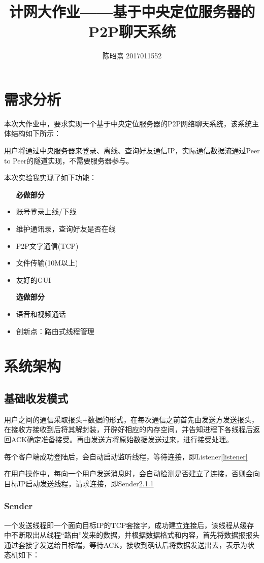 \documentclass[UTF8]{ctexart}
\begin{document}
\title{计网大作业——基于中央定位服务器的P2P聊天系统}
\author{陈昭熹 2017011552}
\maketitle
\tableofcontents
\newpage

\section{需求分析}
本次大作业中，要求实现一个基于中央定位服务器的P2P网络聊天系统，该系统主体结构如下所示：

用户将通过中央服务器来登录、离线、查询好友通信IP，实际通信数据流通过Peer to Peer的隧道实现，不需要服务器参与。

本次实验我实现了如下功能：
\begin{itemize}
    \item[\textbf{必做部分}] 
    \item 账号登录上线/下线
    \item 维护通讯录，查询好友是否在线
    \item P2P文字通信(TCP)
    \item 文件传输(10M以上)
    \item 友好的GUI
    \item[\textbf{选做部分}]
    \item 语音和视频通话
    \item 创新点：路由式线程管理 
\end{itemize}

\section{系统架构}

\subsection{基础收发模式}

用户之间的通信采取报头+数据的形式，在每次通信之前首先由发送方发送报头，在接收方接收到后将其解封装，开辟好相应的内存空间，并告知进程下各线程后返回ACK确定准备接受。再由发送方将原始数据发送过来，进行接受处理。

每个客户端成功登陆后，会自动启动监听线程，等待连接，即Listener\ref{listener}

在用户操作中，每向一个用户发送消息时，会自动检测是否建立了连接，否则会向目标IP启动发送线程，请求连接，即Sender\ref{sender}

\subsubsection{Sender}\label{sender}
一个发送线程即一个面向目标IP的TCP套接字，成功建立连接后，该线程从缓存中不断取出从线程“路由”发来的数据，并根据数据格式和内容，首先将数据报报头通过套接字发送给目标端，等待ACK，接收到确认后将数据发送出去，表示为状态机如下：
\end{document}
